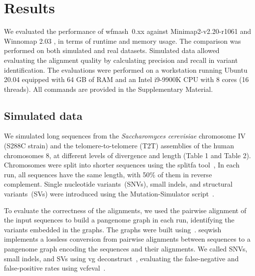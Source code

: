 \documentclass{bioinfo}
\newcommand{\wfmash}{wfmash}
\begin{document}
    \section{Results}

    We evaluated the performance of \wfmash\ 0.xx against Minimap2-v2.20-r1061 \citep{29750242} and Winnomap 2.03 \citep{XXX}, in
    terms of runtime and memory usage. The comparison was performed on both simulated and real datasets. Simulated
    data allowed evaluating the alignment quality by calculating precision and recall in variant identification.
    The evaluations were performed on a workstation running Ubuntu 20.04 equipped with 64 GB of RAM and an Intel i9-9900K
    CPU with 8 cores (16 threads). All commands are provided in the Supplementary Material.

    \subsection{Simulated data}
    We simulated long sequences from the \textit{Saccharomyces cerevisiae} chromosome IV (S288C strain) and
    the telomere-to-telomere (T2T) assemblies of the human chromosomes 8, at different levels of divergence and length
    (Table 1 and Table 2). Chromosomes were split into shorter sequences using the splitfa tool~\citep{splitfa},
    In each run, all sequences have the same length, with 50\% of them in reverse complement.
    Single nucleotide variants~(SNVs), small indels, and structural variants~(SVs) were introduced using the
    Mutation-Simulator script~\citep{32780803}.

    To evaluate the correctness of the alignments, we used the pairwise alignment of the input sequences to build
    a pangenome graph in each run, identifying the variants embedded in the graphs. The graphs were built using~\citep{seqwish}.
    seqwish implements a lossless conversion from pairwise alignments between sequences to a pangenome graph encoding the
    sequences and their alignments. We called SNVs, small indels, and SVs using vg deconstruct~\citep{30125266},
    evaluating the false-negative and false-positive rates using vcfeval~\citep{vcfeval}.
\end{document}
